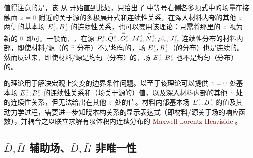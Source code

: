 值得注意的是，该  从  开始直到此处，只给出了  中等号右侧各多项式中的场量在接触面 $\mathcolor{gray}{z \mathcolor{black}{=} 0}$ 附近的关于源的多极展开式和连续性关系。在深入材料内部的其他 $\mathcolor{gray}{z}$ 两侧的基本场 $\bar{E}^{\;\!\mathcolor{gray}{t}}_{\;\!\mathcolor{gray}{z}}, \bar{B}^{\;\!\mathcolor{gray}{t}}_{\;\!\mathcolor{gray}{z}}$ 的连续性关系，也可以套用该理论：只需将那里的 $\mathcolor{gray}{z}$ 视为新的 $\mathcolor{gray}{0}$ 即可。一般而言，在源 $\bar{P}^{\;\!\mathcolor{gray}{t}}_{\;\!\mathcolor{gray}{z}},\bar{\bar{Q}}^{\;\!\mathcolor{gray}{t}}_{\;\!\mathcolor{gray}{z}},\bar{\bar{\bar{O}}}^{\;\!\mathcolor{gray}{t}}_{\;\!\mathcolor{gray}{z}} ; \bar{M}^{\;\!\mathcolor{gray}{t}}_{\;\!\mathcolor{gray}{z}}, \bar{\bar{N}}^{\;\!\mathcolor{gray}{t}}_{\;\!\mathcolor{gray}{z}};{\rho}^{\;\!\mathcolor{gray}{t}}_{\;\!\textcolor{Maroon}{\text{f}}\mathcolor{gray}{z}}, \bar{J}^{\;\!\mathcolor{gray}{t}}_{\;\!\textcolor{Maroon}{\text{f}}\mathcolor{gray}{z}}$ 连续性分布的材料内部，即使材料/源（的 $\mathcolor{gray}{\bar{r}}$ 分布）不是均匀的，场 $\bar{E}^{\;\!\mathcolor{gray}{t}}_{\;\!\mathcolor{gray}{z}}, \bar{B}^{\;\!\mathcolor{gray}{t}}_{\;\!\mathcolor{gray}{z}}$（的分布）也是连续的。然而反过来，即使材料/源是均匀（分布）的，场 $\bar{E}^{\;\!\mathcolor{gray}{t}}_{\;\!\mathcolor{gray}{z}}, \bar{B}^{\;\!\mathcolor{gray}{t}}_{\;\!\mathcolor{gray}{z}}$ 也不是均匀（分布）的。

 的理论用于解决宏观上突变的边界条件问题。以至于该理论可以提供 $\mathcolor{gray}{z \mathcolor{black}{=} 0}$ 处基本场 $\bar{E}^{\;\!\mathcolor{gray}{t}}_{\;\!\mathcolor{gray}{z}}, \bar{B}^{\;\!\mathcolor{gray}{t}}_{\;\!\mathcolor{gray}{z}}$ 的连续性关系和（场关于源的）值，以及深入材料内部的其他 $\mathcolor{gray}{z}$ 处的连续性关系，但无法给出在其他 $\mathcolor{gray}{z}$ 处的值。材料内部基本场 $\bar{E}^{\;\!\mathcolor{gray}{t}}_{\;\!\mathcolor{gray}{z}}, \bar{B}^{\;\!\mathcolor{gray}{t}}_{\;\!\mathcolor{gray}{z}}$ 的值及其动力学过程，需要进一步知晓本构关系的显示表达式（即材料/源关于场的响应函数）\cite{raabMultipoleTheoryElectromagnetism2004}，并耦合之以联立求解有限体积内连续分布\cite{landauCHAPTERXIELECTROMAGNETIC1984}的 \textcolor{Maroon}{Maxwell-Lorentz-Heaviside} 。

\clearpage
\vspace*{-8.0em}

\subsection{$\bar{D},\bar{H}$ 辅助场、$\bar{D},\bar{H}$ 非唯一性}\label{ssec:DH-boundary}

